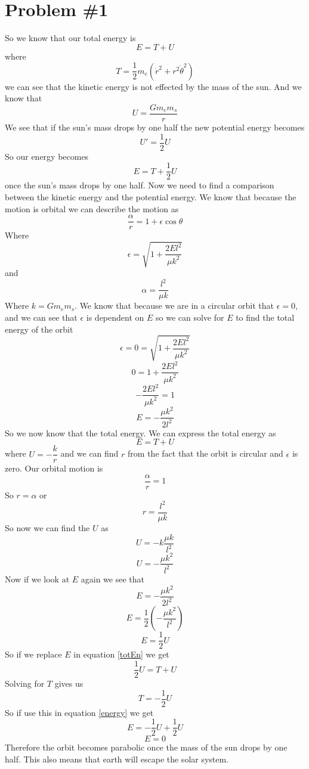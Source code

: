 \documentclass[11pt]{article}
\numberwithin{equation}{section}
\begin{document}


\section{Problem \#1}
So we know that our total energy is 
$$E = T+U$$
where $$T = \frac{1}{2}m_e(\dot{r}^2 +r^2\dot{\theta}^2)$$ we can see that the kinetic energy is not effected by the mass of the sun. And we know that
$$U = \frac{Gm_em_s}{r}$$
We see that if the sun's mass drops by one half the new potential energy becomes
$$U'= \frac{1}{2}U$$
So our energy becomes 
\begin{equation}
E = T+\frac{1}{2}U
\label{energy}
\end{equation}
once the sun's mass drops by one half.
Now we need to find a comparison between the kinetic energy and the potential energy. We know that because the motion is orbital we can describe the motion as
$$\frac{\alpha}{r} = 1 +\epsilon\cos\theta$$
Where
$$\epsilon = \sqrt{1+\dfrac{2El^2}{\mu k^2}}$$
and
$$\alpha = \frac{l^2}{\mu k}$$
Where $k=Gm_em_s$.
We know that because we are in a circular orbit that $\epsilon = 0$, and we can see that $\epsilon$ is dependent on $E$ so we can solve for $E$ to find the total energy of the orbit
$$\epsilon = 0 = \sqrt{1+\dfrac{2El^2}{\mu k^2}}$$
$$ 0 = 1+\dfrac{2El^2}{\mu k^2}$$
$$ -\dfrac{2El^2}{\mu k^2} = 1$$
$$ E =-\dfrac{\mu k^2}{2l^2}$$
So we now know that the total energy. We can express the total energy as
\begin{equation}
E = T + U
\label{totEn}
\end{equation}
where $U=-\dfrac{k}{r}$ and we can find $r$ from the fact that the orbit is circular and $\epsilon$ is zero. Our orbital motion is
$$\frac{\alpha}{r} = 1$$
So $r=\alpha$ or
$$r= \frac{l^2}{\mu k}$$
So now we can find the $U$ as
$$U = -k\frac{\mu k}{l^2}$$
$$U = -\frac{\mu k^2}{l^2}$$
Now if we look at $E$ again we see that
$$ E =-\dfrac{\mu k^2}{2l^2}$$
$$ E =\frac{1}{2}\left(-\dfrac{\mu k^2}{l^2}\right)$$
$$ E =\frac{1}{2}U$$
So if we replace $E$ in equation \ref{totEn} we get
$$\frac{1}{2}U = T + U$$
Solving for $T$ gives us
$$T = -\frac{1}{2}U$$
So if use this in equation \ref{energy} we get 
$$E = -\frac{1}{2}U + \frac{1}{2}U$$
$$E=0$$
Therefore the orbit becomes parabolic once the mass of the sun drops by one half. This also means that earth will escape the solar system.
\end{document}
